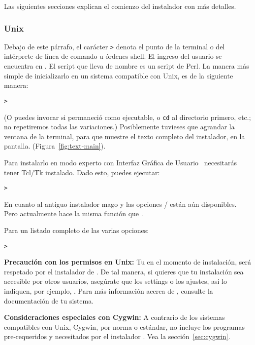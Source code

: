 \documentclass{article}
\begin{document}
\noindent
Las siguientes secciones explican el comienzo del instalador con más
detalles.

\subsubsection{Unix}

Debajo de este párrafo, el carácter \texttt{>} denota el
punto de la terminal o del intérprete de línea de comando u órdenes shell.
El ingreso del usuario se encuentra en
.  El script que lleva de nombre
 es un script de Perl. La manera más
simple de inicializarlo en un sistema compatible con Unix, es
de la siguiente manera: 

\begin{alltt} 
	>  
\end{alltt} 

(O puedes invocar  si
permaneció como ejecutable, o \texttt{cd} al directorio
primero, etc.; no repetiremos todas las variaciones.)
Posiblemente tuvieses que agrandar la ventana de la
terminal, para que muestre el texto completo del instalador,
en la pantalla.  (Figura~\ref{fig:text-main}).

Para instalarlo en modo experto con Interfaz Gráfica de
Usuario \GUI\, necesitarás tener Tcl/Tk instalado. Dado
esto, puedes ejecutar:
\begin{alltt}
	> 
\end{alltt}

En cuanto al antiguo instalador mago  y las opciones
/ están aún disponibles. Pero actualmente hace la misma función que .

Para un listado completo de las varias opciones:
\begin{alltt}
> 
\end{alltt}

\textbf{Precaución con los permisos en Unix:} Tu  en el
momento de instalación, será respetado por el instalador de \TL{}. De
tal manera, si quieres que tu instalación sea accesible por otros
usuarios, asegúrate que los settings o los ajustes, así lo
indiquen, por ejemplo, . Para más
información acerca de 
, consulte la documentación de tu sistema. 

\textbf{Consideraciones especiales con Cygwin:} A contrario de los
sistemas compatibles con Unix, Cygwin, por norma o estándar, no
incluye los programas pre-requeridos y necesitados por el instalador
\TL{}. Vea la sección~\ref{sec:cygwin}.
\end{document}
